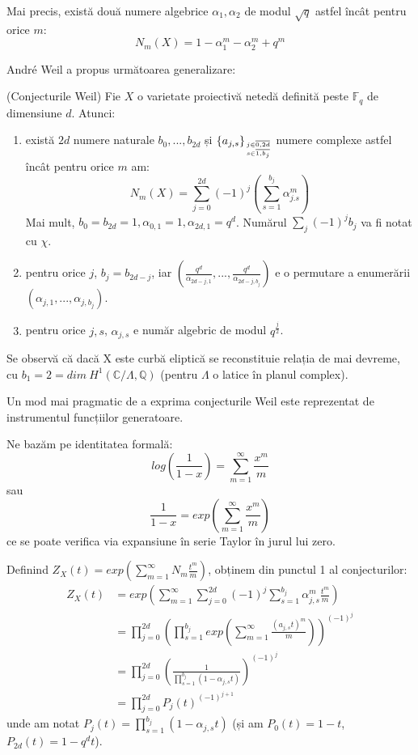 \documentclass[13pt]{book}
\begin{document}
Mai precis, există două numere algebrice $\alpha_1,\alpha_2$ de modul $\sqrt{q}$ astfel încât pentru orice $m$:
$$N_m(X) = 1 - \alpha_1^m - \alpha_2^m + q^m$$

André Weil a propus următoarea generalizare:
\begin{teo}
(Conjecturile Weil) Fie $X$ o varietate proiectivă netedă definită peste $\mathbb{F}_q$ de dimensiune $d$. Atunci:
\begin{enumerate}
\item există $2d$ numere naturale $b_0,...,b_{2d}$ și $\{a_{j,s}\}_{j\in\overline{0,2d}\atop s\in\overline{1,b_j}}$ numere complexe astfel încât pentru orice $m$ am:
$$N_m(X)=\sum\limits_{j=0}^{2d} (-1)^j (\sum\limits_{s=1}^{b_j} \alpha_{j.s}^m)$$
Mai mult, $b_0=b_{2d}=1, \alpha_{0,1}=1, \alpha_{2d,1}=q^d$. Numărul $\sum\limits_j (-1)^j b_j$ va fi notat cu $\chi$.
\item pentru orice $j$, $b_j=b_{2d-j}$, iar $(\frac{q^d}{\alpha_{2d-j,1}},...,\frac{q^d}{\alpha_{2d-j,b_j}})$ e o permutare a enumerării $(\alpha_{j,1},...,\alpha_{j,b_j})$.
\item pentru orice $j,s$, $\alpha_{j,s}$ e număr algebric de modul $q^{\frac{j}{2}}$.
\end{enumerate}
\end{teo}

\begin{obs}
Se observă că dacă X este curbă eliptică se reconstituie relația de mai devreme, cu $b_1=2=dim\ H^1(\mathbb{C}/\Lambda, \mathbb{Q})$ (pentru $\Lambda$ o latice în planul complex).
\end{obs}

Un mod mai pragmatic de a exprima conjecturile Weil este reprezentat de instrumentul funcțiilor generatoare.

Ne bazăm pe identitatea formală:
$$log(\frac{1}{1-x})=\sum\limits_{m=1}^{\infty} \frac{x^m}{m}$$
sau
$$\frac{1}{1-x}=exp(\sum\limits_{m=1}^{\infty} \frac{x^m}{m})$$
ce se poate verifica via expansiune în serie Taylor în jurul lui zero.

Definind $Z_X(t) = exp(\sum\limits_{m=1}^{\infty} N_m \frac{t^m}{m})$, obținem din punctul 1 al conjecturilor:
\begin{align*}
Z_X(t)&=exp(\sum\limits_{m=1}^{\infty} \sum\limits_{j=0}^{2d} (-1)^j \sum\limits_{s=1}^{b_j} \alpha_{j,s}^m \frac{t^m}{m})\\
&=\prod\limits_{j=0}^{2d} (\prod_{s=1}^{b_j} exp(\sum\limits_{m=1}^{\infty} \frac{(a_{j,s} t)^m}{m}))^{(-1)^j}\\
&=\prod\limits_{j=0}^{2d} (\frac{1}{\prod\limits_{s=1}^{b_j}(1-\alpha_{j,s}t)})^{(-1)^j}\\
&=\prod\limits_{j=0}^{2d} P_j(t)^{(-1)^{j+1}}
\end{align*}
unde am notat $P_j(t)=\prod\limits_{s=1}^{b_j}(1-\alpha_{j,s}t)$ (și am $P_0(t)=1-t$, $P_{2d}(t)=1-q^dt$).
\end{document}
